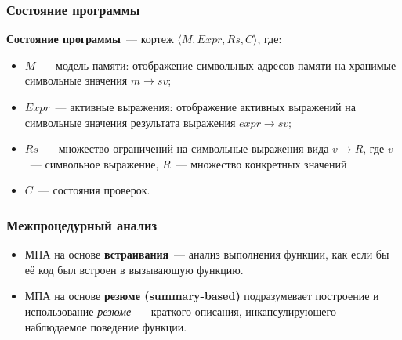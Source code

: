 \documentclass[10pt,gray]{beamer}
\begin{document}

\begin{frame}
\frametitle{Состояние программы}

\textbf{Состояние программы}~--- кортеж $\langle M, Expr, Rs, C \rangle$, где:
\begin{itemize}
 \item $M$~--- модель памяти: отображение символьных адресов памяти на хранимые символьные значения $m \rightarrow sv$;
 \item $Expr$~--- активные выражения: отображение активных выражений на символьные значения результата выражения $expr \rightarrow sv$;
 \item $Rs$~--- множество ограничений на символьные выражения вида $v \rightarrow R$, где $v$~--- символьное выражение, $R$~--- множество конкретных значений
 \item $C$~--- состояния проверок.
\end{itemize}

\end{frame}


\begin{frame}
\frametitle{Межпроцедурный анализ}
\begin{figure}[h]
\end{figure}


\begin{itemize}
 \item МПА на основе \textbf{встраивания}~--- анализ выполнения функции, как если бы её код был встроен в вызывающую функцию.
 \item МПА на основе \textbf{резюме (summary-based)} подразумевает построение и использование \textit{резюме}~--- краткого описания, инкапсулирующего наблюдаемое поведение функции.
\end{itemize}



\end{frame}
\end{document}
